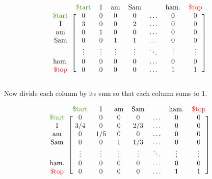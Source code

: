 \begin{align*}
\begin{blockarray}{cccccccc}
& \text{\textcolor[rgb]{.3,.6,.1}{\$tart}} & \text{I} & \text{am} & \text{Sam} & & \text{ham.} & \text{\textcolor[rgb]{1,0,0}{\$top}} \\
\begin{block}{c[ccccccc]}
\text{\textcolor[rgb]{.3,.6,.1}{\$tart}}    & 0 & 0 & 0 & 0 & \ldots & 0 & 0\\
\text{I}        & 3 & 0 & 0 & 2 & \ldots & 0 & 0\\
\text{am}       & 0 & 1 & 0 & 0 & \ldots & 0 & 0\\
\text{Sam}      & 0 & 0 & 1 & 1 & \ldots & 0 & 0\\
& \vdots & \vdots & \vdots & \vdots & \ddots & \vdots & \vdots\\
\text{ham.}     & 0 & 0 & 0 & 0 & \ldots & 0 & 0\\
\text{\textcolor[rgb]{1,0,0}{\$top}}        & 0 & 0 & 0 & 0 & \ldots & 1 & 1\\
\end{block}\end{blockarray}
\end{align*}

Now divide each column by its sum so that each column sums to 1.

\begin{align*}
\begin{blockarray}{cccccccc}
& \text{\textcolor[rgb]{.3,.6,.1}{\$tart}} & \text{I} & \text{am} & \text{Sam} & & \text{ham.} & \text{\textcolor[rgb]{1,0,0}{\$top}} \\
\begin{block}{c[ccccccc]}
\text{\textcolor[rgb]{.3,.6,.1}{\$tart}} & 0 & 0 & 0 & 0 & \ldots & 0 & 0\\
\text{I}        & 3/4 & 0 & 0 & 2/3 & \ldots & 0 & 0\\
\text{am}       & 0 & 1/5 & 0 & 0 & \ldots & 0 & 0\\
\text{Sam}      & 0 & 0 & 1 & 1/3 & \ldots & 0 & 0\\
& \vdots & \vdots & \vdots & \vdots & \ddots & \vdots & \vdots\\
\text{ham.}     & 0 & 0 & 0 & 0 & \ldots & 0 & 0\\
\text{\textcolor[rgb]{1,0,0}{\$top}}    & 0 & 0 & 0 & 0 & \ldots & 1 & 1\\
\end{block}\end{blockarray}
\end{align*}

